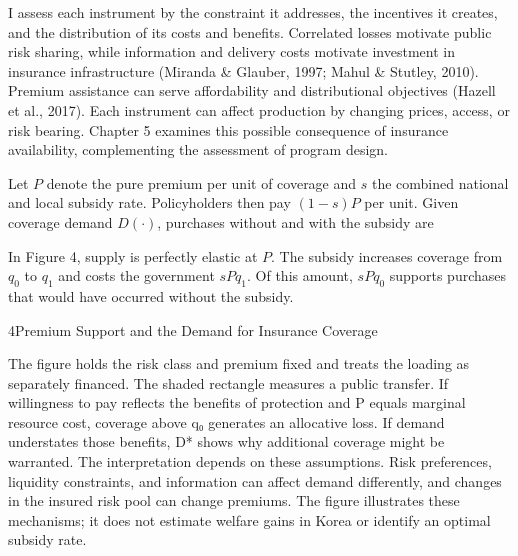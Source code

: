 

I assess each instrument by the constraint it addresses, the incentives it creates, and the distribution of its costs and benefits. Correlated losses motivate public risk sharing, while information and delivery costs motivate investment in insurance infrastructure (Miranda \& Glauber, 1997; Mahul \& Stutley, 2010). Premium assistance can serve affordability and distributional objectives (Hazell et al., 2017). Each instrument can affect production by changing prices, access, or risk bearing. Chapter 5 examines this possible consequence of insurance availability, complementing the assessment of program design.


Let \(P\) denote the pure premium per unit of coverage and \(s\) the combined national and local subsidy rate. Policyholders then pay \((1 - s)P\) per unit. Given coverage demand \(D( \cdot )\), purchases without and with the subsidy are


In Figure 4, supply is perfectly elastic at \(P\). The subsidy increases coverage from \(q_{0}\) to \(q_{1}\) and costs the government \(sPq_{1}\). Of this amount, \(sPq_{0}\) supports purchases that would have occurred without the subsidy.

\begin{wordfigure}{4}{Premium Support and the Demand for Insurance Coverage}
\end{wordfigure}

The figure holds the risk class and premium fixed and treats the loading as separately financed. The shaded rectangle measures a public transfer. If willingness to pay reflects the benefits of protection and P equals marginal resource cost, coverage above q₀ generates an allocative loss. If demand understates those benefits, D* shows why additional coverage might be warranted. The interpretation depends on these assumptions. Risk preferences, liquidity constraints, and information can affect demand differently, and changes in the insured risk pool can change premiums. The figure illustrates these mechanisms; it does not estimate welfare gains in Korea or identify an optimal subsidy rate.

